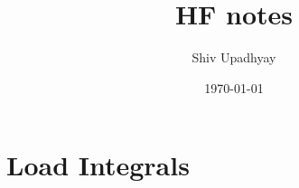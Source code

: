 \documentclass[12pt]{article}
\title{HF notes}
\date{\today}
\author{Shiv Upadhyay}
\begin{document}
\maketitle
\section{Load Integrals}

\newpage


\end{document}
